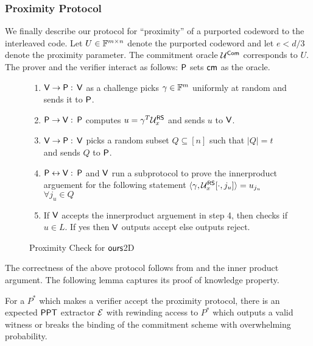 \subsubsection{Proximity Protocol}\label{subsec:proximity2D}
We finally describe our protocol for ``proximity'' of a purported codeword to the interleaved code. Let $U\in \mathbb{F}^{m\times n}$ denote the purported codeword and let $e< d/3$ denote the proximity parameter. The commitment oracle $\mathcal{U}^{\mathsf{Com}}$ corresponds to $U$.
The prover and the verifier interact as follows:
	$\mathsf{P}$ sets $\mathsf{cm}$ as the oracle.
	\begin{figure}[h!]
		\begin{framed}
			\begin{enumerate}
			\item $\mathsf{V} \rightarrow \mathsf{P} :$ $\mathsf{V}$ as a challenge picks $\gamma \in \mathbb{F}^m$ uniformly at random and sends it to $\mathsf{P}$.
	
			\item $\mathsf{P} \rightarrow \mathsf{V} :$ $\mathsf{P}$ computes $u=\gamma^T\mathcal{U}^{\mathsf{RS}}_x$ and sends $u$ to $\mathsf{V}$.
	
			\item $\mathsf{V} \rightarrow \mathsf{P} :$ $\mathsf{V}$ picks a random subset $Q\subseteq [n]$ such that $|Q|=t$ and sends $Q$ to $\mathsf{P}$.
	
			\item $\mathsf{P} \leftrightarrow \mathsf{V}: $ $\mathsf{P}$ and $\mathsf{V}$ run a subprotocol to prove the innerproduct arguement for the following statement $\langle \gamma,\mathcal{U}^{\mathsf{RS}}_x[\cdot,j_u]\rangle=u_{j_u}$ $\forall j_u\in Q$
	
			\item If $\mathsf{V}$ accepts the innerproduct arguement in step 4, then checks if $u\in L$. If yes then $\mathsf{V}$ outputs accept else outputs reject.
			\end{enumerate}
		\end{framed}
	\caption{Proximity Check for $\textsf{ours}$2D}
	\end{figure}
The correctness of the above protocol follows from \cite{ligero} and the inner product argument. The following lemma captures its proof of knowledge property.
\begin{lemma}\label{lem:proximity}
For a $P^*$ which makes a verifier accept the proximity protocol, there is an expected $\mathsf{PPT}$ extractor $\mathcal{E}$ with rewinding access to $P^*$ which outputs a valid witness or breaks the binding of the commitment scheme with overwhelming probability.
\end{lemma}
